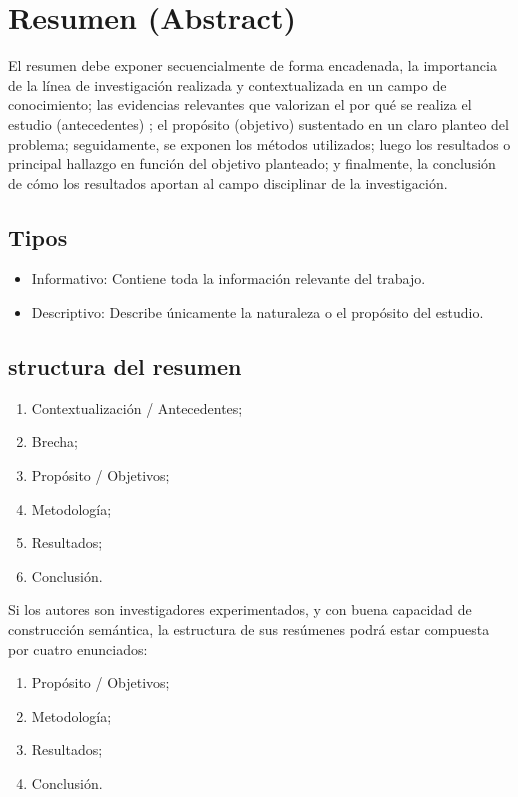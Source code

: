 \documentclass[a4paper,12pt]{article}
\begin{document}
\section{Resumen (Abstract)}

El resumen debe exponer secuencialmente de forma encadenada, la importancia de la línea de investigación realizada y contextualizada en un campo de conocimiento; las evidencias relevantes que valorizan el por qué se realiza el estudio (antecedentes) ; el propósito (objetivo) sustentado en un claro planteo del problema; seguidamente, se exponen los métodos utilizados; luego los resultados o principal hallazgo en función del objetivo planteado; y finalmente, la conclusión de cómo los resultados aportan al campo disciplinar de la investigación.

\subsection{Tipos}


\begin{itemize}
    \item Informativo: Contiene toda la información relevante del trabajo.
    \item Descriptivo: Describe únicamente la naturaleza o el propósito del estudio.
\end{itemize}

\subsection{structura del resumen}

\begin{enumerate}
    \item Contextualización / Antecedentes;
    \item Brecha;
    \item Propósito / Objetivos;
    \item Metodología;
    \item Resultados;
    \item Conclusión.
\end{enumerate}
Si los autores son investigadores experimentados, y con buena capacidad de construcción semántica, la estructura de sus resúmenes podrá estar compuesta por cuatro enunciados: 

\begin{enumerate}
    \item Propósito / Objetivos;
    \item Metodología;
    \item Resultados;
    \item Conclusión.
\end{enumerate}
\end{document}
